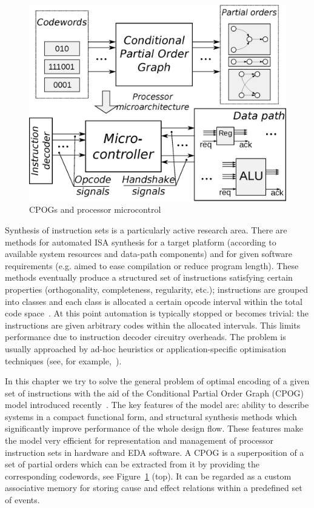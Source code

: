 \begin{figure}
\begin{centering}
\vspace{-3mm}
\includegraphics[width=0.6\columnwidth]{fig/control}\vspace{-1mm}

\par\end{centering}

\caption{CPOGs and processor microcontrol\label{fig:Dynamically-reconfigurable-controller}}
\vspace{-3mm}
\end{figure}


Synthesis of instruction sets is a particularly active research area.
There are methods for automated ISA synthesis for a target platform
(according to available system resources and data-path components)
and for given software requirements (e.g. aimed to ease compilation
or reduce program length). These methods eventually produce a structured
set of instructions satisfying certain properties (orthogonality,
completeness, regularity, etc.); instructions are grouped into classes
and each class is allocated a certain opcode interval within the total
code space~\cite{2003_nohl_dac}. At this point automation is typically
stopped or becomes trivial: the instructions are given arbitrary codes
within the allocated intervals. This limits performance due to instruction
decoder circuitry overheads. The problem is usually approached by
ad-hoc heuristics or application-specific optimisation techniques
(see, for example,~\cite{2002_lee_iccad}).

In this chapter we try to solve the general problem of optimal encoding
of a given set of instructions with the aid of the Conditional Partial
Order Graph (CPOG) model introduced recently~\cite{2009_mokhov_phd}\cite{2010_mokhov_ieee}.
The key features of the model are: ability to describe systems in
a compact functional form, and structural synthesis methods which
significantly improve performance of the whole design flow. These
features make the model very efficient for representation and management
of processor instruction sets in hardware and EDA software. A CPOG
is a superposition of a set of partial orders which can be extracted
from it by providing the corresponding codewords, see Figure~\ref{fig:Dynamically-reconfigurable-controller}
(top). It can be regarded as a custom associative memory for storing
cause and effect relations within a predefined set of events.

